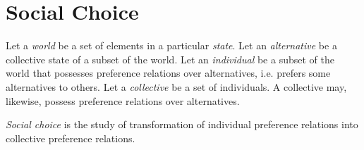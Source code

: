 
\section{Social Choice}

Let a \emph{world} be a set of elements in a particular \emph{state}. Let an
\emph{alternative} be a collective state of a subset of the world. Let an
\emph{individual} be a subset of the world that possesses preference relations
over alternatives, i.e. prefers some alternatives to others. Let a
\emph{collective} be a set of individuals. A collective may, likewise, possess
preference relations over alternatives.

\emph{Social choice} is the study of transformation of individual preference
relations into collective preference relations.

